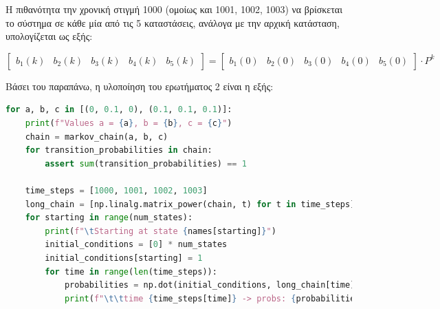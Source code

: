 \documentclass{article}
\begin{document}
Η πιθανότητα την χρονική στιγμή 1000 (ομοίως και 1001, 1002, 1003) να βρίσκεται
το σύστημα σε κάθε μία από τις 5 καταστάσεις, ανάλογα με την αρχική κατάσταση,
υπολογίζεται ως εξής:


\begin{equation}
        \begin{bmatrix}
            b_1(k) & b_2(k) & b_3(k) & b_4(k) & b_5(k)
        \end{bmatrix} =
        \begin{bmatrix}
            b_1(0) & b_2(0) & b_3(0) & b_4(0) & b_5(0)
        \end{bmatrix}\cdot P^k 
\end{equation}

Βάσει του παραπάνω, η υλοποίηση του ερωτήματος 2 είναι η εξής:

\begin{lstlisting}[language=Python]
for a, b, c in [(0, 0.1, 0), (0.1, 0.1, 0.1)]:
    print(f"Values a = {a}, b = {b}, c = {c}")
    chain = markov_chain(a, b, c)
    for transition_probabilities in chain:
        assert sum(transition_probabilities) == 1

    time_steps = [1000, 1001, 1002, 1003]
    long_chain = [np.linalg.matrix_power(chain, t) for t in time_steps]
    for starting in range(num_states):
        print(f"\tStarting at state {names[starting]}")
        initial_conditions = [0] * num_states
        initial_conditions[starting] = 1
        for time in range(len(time_steps)):
            probabilities = np.dot(initial_conditions, long_chain[time])
            print(f"\t\ttime {time_steps[time]} -> probs: {probabilities}")
\end{lstlisting}
\end{document}
